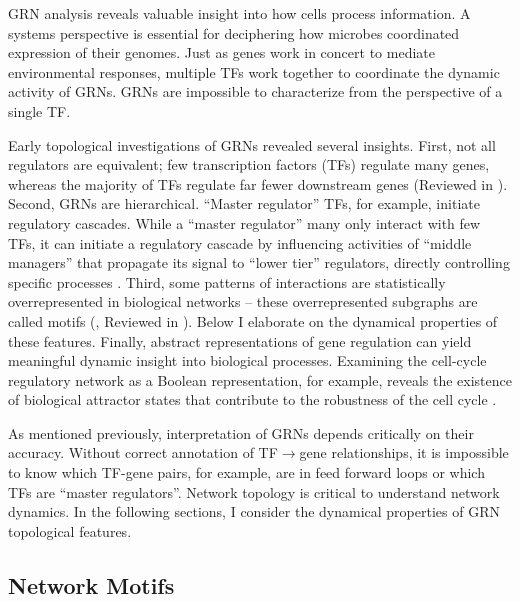  GRN analysis reveals valuable insight into how cells process information. A systems perspective is essential for deciphering how microbes coordinated expression of their genomes. Just as genes work in concert to mediate environmental responses, multiple TFs work together to coordinate the dynamic activity of GRNs. GRNs are impossible to characterize from the perspective of a single TF. 

 Early topological investigations of GRNs revealed several insights. First, not all regulators are equivalent; few transcription factors (TFs) regulate many genes, whereas the majority of TFs regulate far fewer downstream genes (Reviewed in \cite{barabasi_network_2004}). Second, GRNs are hierarchical. ``Master regulator'' TFs, for example, initiate regulatory cascades. While a ``master regulator'' many only interact with few TFs, it can initiate a regulatory cascade by influencing activities of ``middle managers'' that propagate its signal to ``lower tier'' regulators, directly controlling specific processes  \cite{yu_genomic_2006}. Third, some patterns of interactions are statistically overrepresented in biological networks -- these overrepresented subgraphs are called motifs (\cite{milo_network_2002}, Reviewed in \cite{alon_network_2007}). Below I elaborate on the dynamical properties of these features. Finally, abstract representations of gene regulation can yield meaningful dynamic insight into biological processes. Examining the cell-cycle regulatory network as a Boolean representation, for example, reveals the existence of biological attractor states that contribute to the robustness of the cell cycle \cite{li_yeast_2004}.    

As mentioned previously, interpretation of GRNs depends critically on their accuracy. Without correct annotation of TF$\rightarrow$gene relationships, it is impossible to know which TF-gene pairs, for example, are in feed forward loops or which TFs are ``master regulators''.  Network topology is critical to understand network dynamics. In the following sections, I consider the dynamical properties of GRN topological features. 

\subsection{Network Motifs}

